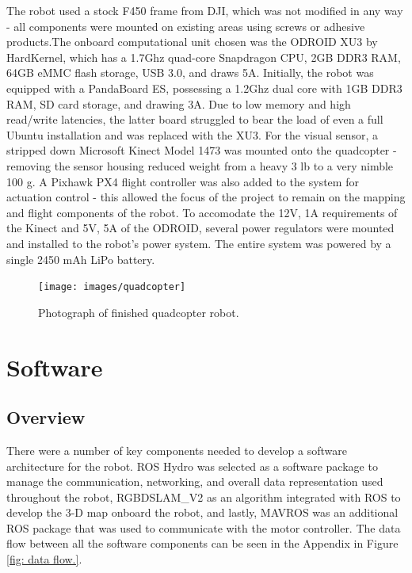 \documentclass[letterpaper, oneside, 10pt]{report}
\begin{document}
The robot used a stock F450 frame from DJI, which was not modified in any way - all components were mounted on existing areas using screws or adhesive products.The onboard computational unit chosen was the ODROID XU3 by HardKernel, which has a 1.7Ghz quad-core Snapdragon CPU, 2GB DDR3 RAM, 64GB eMMC flash storage, USB 3.0, and draws 5A. Initially, the robot was equipped with a PandaBoard ES, possessing a 1.2Ghz dual core with 1GB DDR3 RAM, SD card storage, and drawing 3A. Due to low memory and high read/write latencies, the latter board struggled to bear the load of even a full Ubuntu installation and was replaced with the XU3. For the visual sensor, a stripped down Microsoft Kinect Model 1473 was mounted onto the quadcopter - removing the sensor housing reduced weight from a heavy 3 lb to a very nimble 100 g. A Pixhawk PX4 flight controller was also added to the system for actuation control - this allowed the focus of the project to remain on the mapping and flight components of the robot. To accomodate the 12V, 1A requirements of the Kinect and 5V, 5A of the ODROID, several power regulators were mounted and installed to the robot's power system. The entire system was powered by a single 2450 mAh LiPo battery.

\begin{figure}[h!]
 \caption{Photograph of finished quadcopter robot.}
 \centering
   \texttt{[image: images/quadcopter]}
\end{figure}

\section{Software}

\subsection{Overview}

There were a number of key components needed to develop a software architecture for the robot. ROS Hydro was selected as a software package to manage the communication, networking, and overall data representation used throughout the robot, RGBDSLAM\_V2 as an algorithm integrated with ROS to develop the 3-D map onboard the robot, and lastly, MAVROS was an additional ROS package that was used to communicate with the motor controller. The data flow between all the software components can be seen in the Appendix in Figure \ref{fig: data flow.}.
\end{document}

